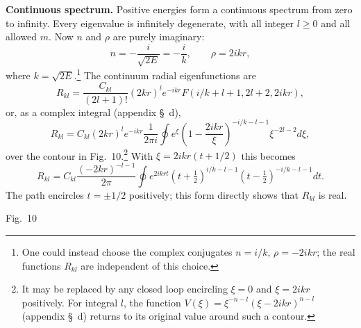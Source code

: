 \textbf{Continuous spectrum.} Positive energies form a continuous spectrum
from zero to infinity. Every eigenvalue is infinitely degenerate, with all
integer $l\geq0$ and all allowed $m$. Now $n$ and $\rho$ are purely imaginary:
\begin{equation}n=-\frac i{\sqrt{2E}}=-\frac ik,\qquad\rho=2ikr,\tag{36.17}\end{equation}
where $k=\sqrt{2E}$.\footnote{One could instead choose the complex conjugates
$n=i/k$, $\rho=-2ikr$; the real functions $R_{kl}$ are independent of this
choice.} The continuum radial eigenfunctions are
\begin{equation}
 R_{kl}=\frac{C_{kl}}{(2l+1)!}(2kr)^le^{-ikr}
 F(i/k+l+1,2l+2,2ikr),\tag{36.18}
\end{equation}
or, as a complex integral (appendix \S~d),
\begin{equation}
 R_{kl}=C_{kl}(2kr)^le^{-ikr}\frac1{2\pi i}\oint
 e^\xi\left(1-\frac{2ikr}{\xi}\right)^{-i/k-l-1}\xi^{-2l-2}d\xi,
 \tag{36.19}
\end{equation}
over the contour in Fig.~10.\footnote{It may be replaced by any closed loop
encircling $\xi=0$ and $\xi=2ikr$ positively. For integral $l$, the function
$V(\xi)=\xi^{-n-l}(\xi-2ikr)^{n-l}$ (appendix \S~d) returns to its original
value around such a contour.} With $\xi=2ikr(t+1/2)$ this becomes
\begin{equation}
 R_{kl}=C_{kl}\frac{(-2kr)^{-l-1}}{2\pi}\oint e^{2ikrt}
 (t+\tfrac12)^{i/k-l-1}(t-\tfrac12)^{-i/k-l-1}dt.\tag{36.20}
\end{equation}
The path encircles $t=\pm1/2$ positively; this form directly shows that
$R_{kl}$ is real.

\begin{center}

\small Fig.~10
\end{center}

